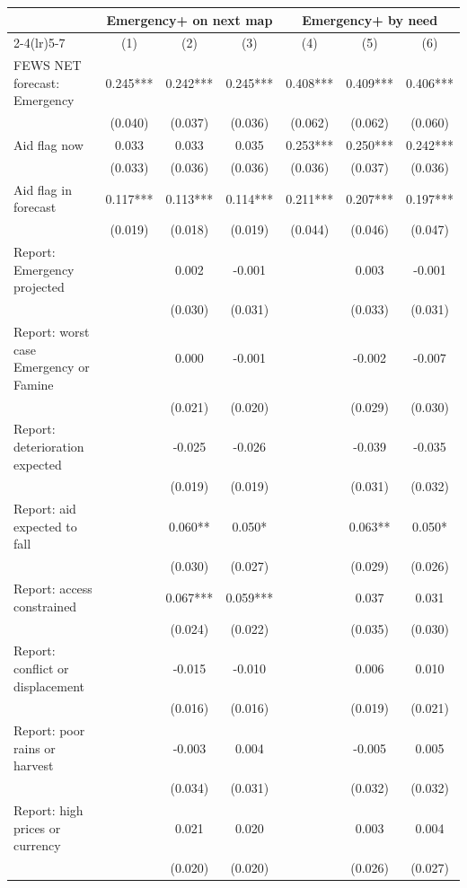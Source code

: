 \begin{tabular}{lcccccc}
\toprule
 & \multicolumn{3}{c}{Emergency+ on next map} & \multicolumn{3}{c}{Emergency+ by need} \\
\cmidrule(lr){2-4}\cmidrule(lr){5-7}
 & (1) & (2) & (3) & (4) & (5) & (6) \\
\midrule
FEWS NET forecast: Emergency & 0.245*** & 0.242*** & 0.245*** & 0.408*** & 0.409*** & 0.406*** \\
 & (0.040) & (0.037) & (0.036) & (0.062) & (0.062) & (0.060) \\
Aid flag now & 0.033 & 0.033 & 0.035 & 0.253*** & 0.250*** & 0.242*** \\
 & (0.033) & (0.036) & (0.036) & (0.036) & (0.037) & (0.036) \\
Aid flag in forecast & 0.117*** & 0.113*** & 0.114*** & 0.211*** & 0.207*** & 0.197*** \\
 & (0.019) & (0.018) & (0.019) & (0.044) & (0.046) & (0.047) \\
Report: Emergency projected &  & 0.002 & -0.001 &  & 0.003 & -0.001 \\
 &  & (0.030) & (0.031) &  & (0.033) & (0.031) \\
Report: worst case Emergency or Famine &  & 0.000 & -0.001 &  & -0.002 & -0.007 \\
 &  & (0.021) & (0.020) &  & (0.029) & (0.030) \\
Report: deterioration expected &  & -0.025 & -0.026 &  & -0.039 & -0.035 \\
 &  & (0.019) & (0.019) &  & (0.031) & (0.032) \\
Report: aid expected to fall &  & 0.060** & 0.050* &  & 0.063** & 0.050* \\
 &  & (0.030) & (0.027) &  & (0.029) & (0.026) \\
Report: access constrained &  & 0.067*** & 0.059*** &  & 0.037 & 0.031 \\
 &  & (0.024) & (0.022) &  & (0.035) & (0.030) \\
Report: conflict or displacement &  & -0.015 & -0.010 &  & 0.006 & 0.010 \\
 &  & (0.016) & (0.016) &  & (0.019) & (0.021) \\
Report: poor rains or harvest &  & -0.003 & 0.004 &  & -0.005 & 0.005 \\
 &  & (0.034) & (0.031) &  & (0.032) & (0.032) \\
Report: high prices or currency &  & 0.021 & 0.020 &  & 0.003 & 0.004 \\
 &  & (0.020) & (0.020) &  & (0.026) & (0.027) \\

\end{tabular}
